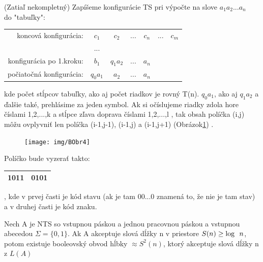 \begin{dokaz}(Zatiaľ nekompletný) Zapíšeme konfigurácie TS pri výpočte na slove
$a_1a_2...a_n$\\ do "tabuľky":
\begin{center}
\begin{tabular}{rcccccc}

   koncová konfigurácia:& $c_1$    &  $c_2$   & $...$ & $c_n$  & $...$ & $c_m$ \\

                        & $...$    &          &       &     \\

konfigurácia po 1.kroku:& $b_1$    & $q_1a_2$ & $...$ & $a_n$     \\

počiatočná konfigurácia:& $q_0a_1$ & $a_2$    & $...$ & $a_n$     \\

\end{tabular}
\end{center}
kde počet stĺpcov tabuľky, ako aj počet riadkov je rovný T(n). $q_0a_1$, ako aj $q_1a_2$
a ďalšie také, prehlásime za jeden symbol. Ak si očíslujeme riadky zdola hore číslami
1,2,...,k a stĺpce zľava doprava číslami 1,2,...,l , tak obsah políčka (i,j) môžu
ovplyvniť len políčka (i-1,j-1), (i-1,j) a (i-1,j+1) (Obrázok\ref{BObr4}) .
\begin{figure}[!ht]
\centering
\texttt{[image: img/BObr4]}
\caption{} \label{BObr4}
\end{figure}

Políčko bude vyzerať takto: \begin{tabular}{|c|c|} \hline 1011 & 0101 \\ \hline
\end{tabular}, kde v prvej časti je kód stavu (ak je tam 00...0 znamená to, že nie je tam
stav) a v druhej časti je kód znaku.

\end{dokaz}

\begin{veta}
Nech A je NTS so vstupnou páskou a jednou pracovnou páskou a vstupnou abecedou
$\Sigma=\{0,1\}$. Ak A akceptuje slová dĺžky n v priestore $S(n)\geq \log\enspace n$, potom
existuje booleovský obvod hĺbky $\approx S^2(n)$, ktorý akceptuje slová dĺžky n z $L(A)$
\end{veta}

